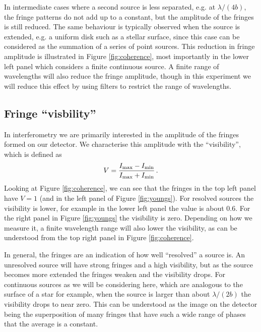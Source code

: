 \documentclass[11pt]{article}
\begin{document}
In intermediate cases where a second source is less separated, e.g. at $\lambda/(4b)$, the fringe patterns do not add up to a constant, but the amplitude of the fringes is still reduced. The same behaviour is typically observed when the source is extended, e.g. a uniform disk such as a stellar surface, since this case can be considered as the summation of a series of point sources. This reduction in fringe amplitude is illustrated in Figure \ref{fig:coherence}, most importantly in the lower left panel which considers a finite continuous source. A finite range of wavelengths will also reduce the fringe amplitude, though in this experiment we will reduce this effect by using filters to restrict the range of wavelengths.

\subsection{Fringe ``visbility''}

In interferometry we are primarily interested in the amplitude of the fringes formed on our detector. We characterise this amplitude with the ``visibility'', which is defined as
\begin{equation}\label{eq:vis}
    V = \frac{I_{\rm max} - I_{\rm min}}{I_{\rm max} + I_{\rm min}} \, .
\end{equation}
Looking at Figure \ref{fig:coherence}, we can see that the fringes in the top left panel have $V=1$ (and in the left panel of Figure \ref{fig:youngs}). For resolved sources the visibility is lower, for example in the lower left panel the value is about 0.6. For the right panel in Figure \ref{fig:youngs} the visibility is zero. Depending on how we measure it, a finite wavelength range will also lower the visibility, as can be understood from the top right panel in Figure \ref{fig:coherence}.

\clearpage

In general, the fringes are an indication of how well ``resolved'' a source is. An unresolved source will have strong fringes and a high visibility, but as the source becomes more extended the fringes weaken and the visibility drops. For continuous sources as we will be considering here, which are analogous to the surface of a star for example, when the source is larger than about $\lambda/(2b)$ the visibility drops to near zero. This can be understood as the image on the detector being the superposition of many fringes that have such a wide range of phases that the average is a constant.
\end{document}
